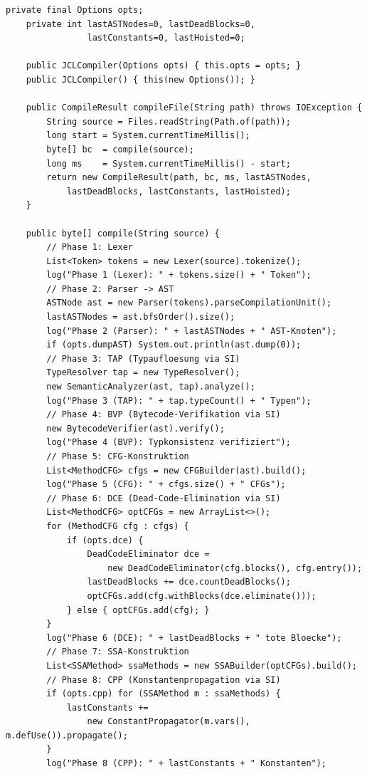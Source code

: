 ﻿\documentclass[a4paper,12pt]{article}
\theoremstyle{definition}
\begin{document}
\begin{lstlisting}[style=javastyle,
    caption={JCLCompiler.java -- vollstaendige 13-Phasen-Pipeline}]
    private final Options opts;
    private int lastASTNodes=0, lastDeadBlocks=0,
                lastConstants=0, lastHoisted=0;

    public JCLCompiler(Options opts) { this.opts = opts; }
    public JCLCompiler() { this(new Options()); }

    public CompileResult compileFile(String path) throws IOException {
        String source = Files.readString(Path.of(path));
        long start = System.currentTimeMillis();
        byte[] bc  = compile(source);
        long ms    = System.currentTimeMillis() - start;
        return new CompileResult(path, bc, ms, lastASTNodes,
            lastDeadBlocks, lastConstants, lastHoisted);
    }

    public byte[] compile(String source) {
        // Phase 1: Lexer
        List<Token> tokens = new Lexer(source).tokenize();
        log("Phase 1 (Lexer): " + tokens.size() + " Token");
        // Phase 2: Parser -> AST
        ASTNode ast = new Parser(tokens).parseCompilationUnit();
        lastASTNodes = ast.bfsOrder().size();
        log("Phase 2 (Parser): " + lastASTNodes + " AST-Knoten");
        if (opts.dumpAST) System.out.println(ast.dump(0));
        // Phase 3: TAP (Typaufloesung via SI)
        TypeResolver tap = new TypeResolver();
        new SemanticAnalyzer(ast, tap).analyze();
        log("Phase 3 (TAP): " + tap.typeCount() + " Typen");
        // Phase 4: BVP (Bytecode-Verifikation via SI)
        new BytecodeVerifier(ast).verify();
        log("Phase 4 (BVP): Typkonsistenz verifiziert");
        // Phase 5: CFG-Konstruktion
        List<MethodCFG> cfgs = new CFGBuilder(ast).build();
        log("Phase 5 (CFG): " + cfgs.size() + " CFGs");
        // Phase 6: DCE (Dead-Code-Elimination via SI)
        List<MethodCFG> optCFGs = new ArrayList<>();
        for (MethodCFG cfg : cfgs) {
            if (opts.dce) {
                DeadCodeEliminator dce =
                    new DeadCodeEliminator(cfg.blocks(), cfg.entry());
                lastDeadBlocks += dce.countDeadBlocks();
                optCFGs.add(cfg.withBlocks(dce.eliminate()));
            } else { optCFGs.add(cfg); }
        }
        log("Phase 6 (DCE): " + lastDeadBlocks + " tote Bloecke");
        // Phase 7: SSA-Konstruktion
        List<SSAMethod> ssaMethods = new SSABuilder(optCFGs).build();
        // Phase 8: CPP (Konstantenpropagation via SI)
        if (opts.cpp) for (SSAMethod m : ssaMethods) {
            lastConstants +=
                new ConstantPropagator(m.vars(), m.defUse()).propagate();
        }
        log("Phase 8 (CPP): " + lastConstants + " Konstanten");

\end{lstlisting}
\end{document}
